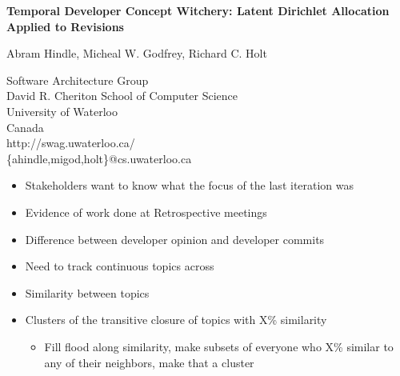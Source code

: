 \documentclass[titlepage,usenames,a4,landscape,semhelv]{seminar}
\author{
\names \\ 
{\small Software Architecture Group }\\
\small David R. Cheriton School of Computer Science\\
\small University of Waterloo\\
\small Canada\\
ahindle@cs.uwaterloo.ca
}
\newcommand{\gettitle}{Temporal Developer Concept Witchery: Latent Dirichlet Allocation Applied to Revisions}
\newcommand{\gettitleproper}{\gettitle}
\newcommand{\names}{Abram Hindle, Micheal W. Godfrey, Richard C. Holt}
\begin{document}
\pagestyle{fancy} %
\begin{slide}

\begin{center}
{\bf \LARGE \gettitleproper }

{\names } 

{\small Software Architecture Group }\\[-.5em]
{\small David R. Cheriton School of Computer Science}\\[-.5em]
{\small University of Waterloo}\\[-.5em]
{\small Canada}\\[-.5em]
{\small http://swag.uwaterloo.ca/}\\
\{ahindle,migod,holt\}@cs.uwaterloo.ca


\end{center}

\begin{itemize}
\item Stakeholders want to know what the focus of the last iteration was
\item Evidence of work done at Retrospective meetings
\item Difference between developer opinion and developer commits

\end{itemize}
\begin{itemize}
\item Need to track continuous topics across 
\item Similarity between topics
\item Clusters of the transitive closure of topics with X\% similarity
	\begin{itemize}
	\item Fill flood along similarity, make subsets of everyone who X\% similar to any of their neighbors, make that a cluster

\newslide








\end{itemize}
\end{itemize}
\end{slide}
\end{document}
